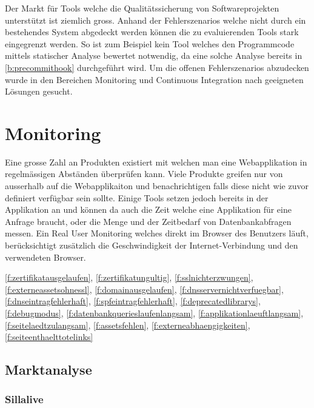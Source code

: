 
Der Markt für Tools welche die Qualitätssicherung von Softwareprojekten unterstützt ist ziemlich gross. Anhand der Fehlerszenarios welche nicht durch ein bestehendes System abgedeckt werden können die zu evaluierenden Tools stark eingegrenzt werden. So ist zum Beispiel kein Tool welches den Programmcode mittels statischer Analyse bewertet notwendig, da eine solche Analyse bereits in \ref{b:precommithook} durchgeführt wird. Um die offenen Fehlerszenarios abzudecken wurde in den Bereichen Monitoring und Continuous Integration nach geeigneten Lösungen gesucht.

\section{Monitoring}
\label{sec:monitoring_evaluation}
Eine grosse Zahl an Produkten existiert mit welchen man eine Webapplikation in regelmässigen Abständen überprüfen kann. Viele Produkte greifen nur von ausserhalb auf die Webapplikaiton und benachrichtigen falls diese nicht wie zuvor definiert verfügbar sein sollte. Einige Tools setzen jedoch bereits in der Applikation an und können da auch die Zeit welche eine Applikation für eine Anfrage braucht, oder die Menge und der Zeitbedarf von Datenbankabfragen messen. Ein Real User Monitoring welches direkt im Browser des Benutzers läuft, berücksichtigt zusätzlich die Geschwindigkeit der Internet-Verbindung und den verwendeten Browser.

\ref{f:zertifikatausgelaufen}, \ref{f:zertifikatungultig}, \ref{f:sslnichterzwungen}, \ref{f:externeassetsohnessl}, \ref{f:domainausgelaufen}, \ref{f:dnsservernichtverfuegbar}, \ref{f:dnseintragfehlerhaft}, \ref{f:spfeintragfehlerhaft}, \ref{f:deprecatedlibrarys}, \ref{f:debugmodus}, \ref{f:datenbankquerieslaufenlangsam}, \ref{f:applikationlaeuftlangsam}, \ref{f:seitelaedtzulangsam}, \ref{f:assetsfehlen}, \ref{f:externeabhaengigkeiten}, \ref{f:seiteenthaelttotelinks}

\subsection{Marktanalyse}
\label{sub:marktanalyse}

\subsubsection{Sillalive}
\label{ssub:sillalive}

